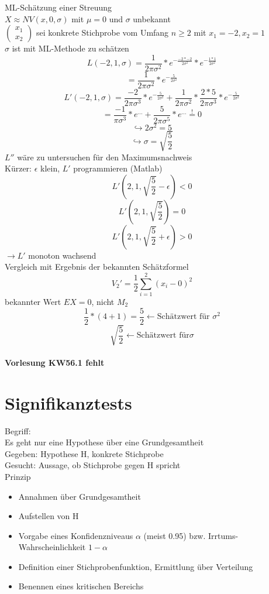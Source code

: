 \documentclass[a4paper,12pt]{scrartcl}
\begin{document}
 ML-Schätzung einer Streuung\\
 $X\approx NV(x,0,\sigma)$ mit $\mu=0$ und $\sigma$ unbekannt\\
 $\begin{pmatrix}
   x_1\\x_2
  \end{pmatrix}$ sei konkrete Stichprobe vom Umfang $n\geq 2$ mit $x_1=-2,x_2=1$\\
  $\sigma$ ist mit ML-Methode zu schätzen
  $$L(-2,1,\sigma) = \frac{1}{2\pi\sigma^2}*e^{-\frac{-2*-2}{2\sigma^2}}*e^{-\frac{1*1}{2\sigma^2}}$$
  $$= \frac{1}{2\pi\sigma^2}*e^{-\frac{5}{2\sigma^2}} $$
  $$L'(-2,1,\sigma) = \frac{-2}{2\pi\sigma^3}*e^{-\frac{5}{2\sigma^2}} +\frac{1}{2\pi\sigma^2}*\frac{2*5}{2\pi\sigma^3}*e^{-\frac{5}{2\sigma^2}}$$
  $$=\frac{-1}{\pi\sigma^3}*e^{\dots}+\frac{5}{2\pi\sigma^5}*e^{\dots} \overset{!}{=}0$$
  $$\hookrightarrow 2\sigma^2=5$$
  $$\hookrightarrow \sigma = \sqrt{\frac{5}{2}}$$
  $L''$ wäre zu untersuchen für den Maximumsnachweis\\
  Kürzer: $\epsilon$ klein, $L'$ programmieren (Matlab)
  $$L'(2,1,\sqrt{\frac{5}{2}}-\epsilon)<0$$
  $$L'(2,1,\sqrt{\frac{5}{2}})=0$$
  $$L'(2,1,\sqrt{\frac{5}{2}}+\epsilon)>0$$
  $\to L'$ monoton wachsend\\
  Vergleich mit Ergebnis der bekannten Schätzformel
  $$V_2'= \frac{1}{2}\sum_{i=1}^2(x_i-0)^2$$
  bekannter Wert $EX=0$, nicht $M_2$
  $$\frac{1}{2}*(4+1)=\frac{5}{2}\leftarrow\text{Schätzwert für }\sigma^2$$
  $$\sqrt{\frac{5}{2}}\leftarrow\text{Schätzwert für} \sigma$$

 \paragraph{Vorlesung KW56.1 fehlt}
  
  \section{Signifikanztests}
 
 Begriff:\\
 Es geht nur eine Hypothese über eine Grundgesamtheit\\
 Gegeben: Hypothese H, konkrete Stichprobe\\
 Gesucht: Aussage, ob Stichprobe gegen H spricht\\
 Prinzip
 \begin{itemize}
  \item Annahmen über Grundgesamtheit
  \item Aufstellen von H
  \item Vorgabe eines Konfidenzniveaus $\alpha$ (meist 0.95) bzw. Irrtums-Wahrscheinlichkeit $1-\alpha$
  \item Definition einer Stichprobenfunktion, Ermittlung über Verteilung
  \item Benennen eines kritischen Bereichs
 \end{itemize}
\end{document}
